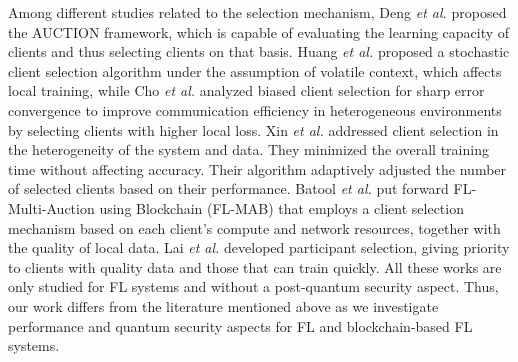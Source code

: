 Among different studies related to the selection mechanism,
Deng \textit{et al.} \cite{dengAUCTIONAutomatedQualityAware2022} proposed the AUCTION framework,
which is capable of evaluating the learning capacity of clients and
thus selecting clients on that basis.
Huang \textit{et al.} \cite{huangStochasticClientSelection2022} proposed a stochastic client selection algorithm
under the assumption of volatile context, which affects local training, while Cho \textit{et al.} \cite{powerofchoice} analyzed biased client selection
for sharp error convergence to improve communication efficiency in heterogeneous environments by selecting clients with higher local loss. 
Xin \textit{et al.} \cite{xinFederatedLearningClient2022} addressed client selection in the heterogeneity of the system and data.
They minimized the overall training time without affecting accuracy.
Their algorithm
adaptively adjusted the number of selected clients based on their performance.
Batool \textit{et al.} \cite{batoolFLMABClientSelection2022} put forward FL-Multi-Auction using Blockchain (FL-MAB) 
that employs a client selection mechanism based on each client's compute and network resources,
together with the quality of local data.
Lai \textit{et al.} \cite{laiOortEfficientFederated} developed participant selection, 
giving priority to clients with quality data and those that can train quickly. 
All these works \cite{dengAUCTIONAutomatedQualityAware2022, huangStochasticClientSelection2022, powerofchoice, xinFederatedLearningClient2022, batoolFLMABClientSelection2022, laiOortEfficientFederated} are only studied for FL systems and without a post-quantum security aspect.
Thus, our work differs from the literature mentioned above as we investigate performance and quantum security aspects for FL and blockchain-based FL systems.

